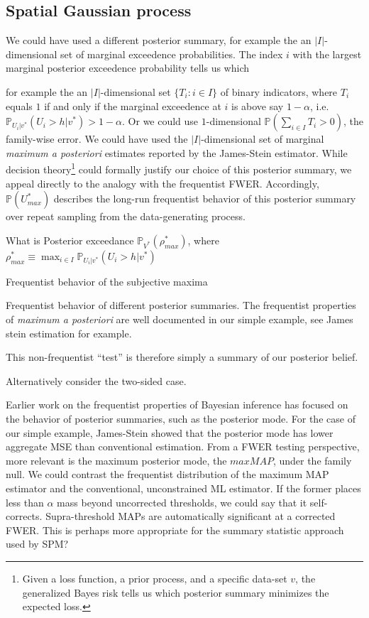 \documentclass{article}
\begin{document}
\subsection{Spatial Gaussian process}
We could have used a different posterior summary, for example the an $|I|$-dimensional set of marginal exceedence probabilities. The index $i$ with the largest marginal posterior exceedence probability tells us which 

for example the an $|I|$-dimensional set $\{T_i: i \in I \}$ of binary indicators, where $T_i$ equals $1$ if and only if the marginal exceedence at $i$ is above say $1-\alpha$, i.e. $\mathbb{P}_{U_i|v^*}(U_i>h|v^*)>1-\alpha$. Or we could use $1$-dimensional $\mathbb{P}(\sum_{i \in I}T_i>0)$, the family-wise error. We could have used the $|I|$-dimensional set of marginal \textit{maximum a posteriori} estimates reported by the James-Stein estimator. While decision theory\footnote{Given a loss function, a prior process, and a specific data-set $v$, the generalized Bayes risk tells us which posterior summary minimizes the expected loss.} could formally justify our choice of this posterior summary, we appeal directly to the analogy with the frequentist FWER. Accordingly, $\mathbb{P}(U_{max}^*)$ describes the long-run frequentist behavior of this posterior summary over repeat sampling from the data-generating process.  



What is Posterior exceedance $\mathbb{P}_{V^*}(\rho_{max}^*)$, where  $\rho_{max}^* \equiv \max_{i \in I} \mathbb{P}_{U_i|v^*}(U_i>h|v^*)$

Frequentist behavior of the subjective maxima


Frequentist behavior of different posterior summaries. The frequentist properties of \textit{maximum a posteriori} are well documented in our simple example, see James stein estimation for example. 

This non-frequentist ``test'' is therefore simply a summary of our posterior belief.


Alternatively consider the two-sided case.

Earlier work on the frequentist properties of Bayesian inference has focused on the behavior of posterior summaries, such as the posterior mode. For the case of our simple example, James-Stein showed that the posterior mode has lower aggregate MSE than conventional estimation. From a FWER testing perspective, more relevant is the maximum posterior mode, the $maxMAP$, under the family null. We could contrast the frequentist distribution of the maximum MAP estimator and the conventional, unconstrained ML estimator. If the former places less than $\alpha$ mass beyond uncorrected thresholds, we could say that it self-corrects. Supra-threshold MAPs are automatically significant at a corrected FWER. This is perhaps more appropriate for the summary statistic approach used by SPM?
\end{document}
